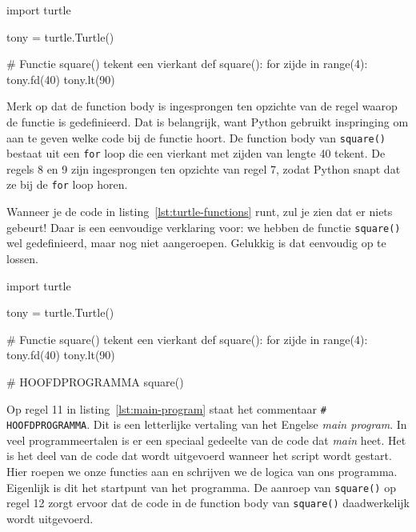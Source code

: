 \documentclass[../main]{subfiles}
\begin{document}
\begin{python}[style=mu, caption={\file{turtle\_functions.py}}, label={lst:turtle-functions},name=functionbody, framextopmargin=3pt, framexleftmargin=3pt]
import turtle

tony = turtle.Turtle()

# Functie square() tekent een vierkant
def square():
    for zijde in range(4):
        tony.fd(40)
        tony.lt(90)
\end{python}



 Merk op dat de function body is ingesprongen ten opzichte van de regel waarop de functie is gedefinieerd. Dat is belangrijk, want Python gebruikt inspringing om aan te geven welke code bij de functie hoort. De function body van \texttt{square()} bestaat uit een \texttt{for} loop die een vierkant met zijden van lengte 40 tekent. De regels 8 en 9 zijn ingesprongen ten opzichte van regel 7, zodat Python snapt dat ze bij de \texttt{for} loop horen.

 Wanneer je de code in listing~\ref{lst:turtle-functions} runt, zul je zien dat er niets gebeurt! Daar is een eenvoudige verklaring voor: we hebben de functie \texttt{square()} wel gedefinieerd, maar nog niet aangeroepen. Gelukkig is dat eenvoudig op te lossen.

\begin{python}[style=mu, caption={Functieaanroep in het hoofdprogramma}, label={lst:main-program}]
import turtle

tony = turtle.Turtle()

# Functie square() tekent een vierkant
def square():
    for zijde in range(4):
        tony.fd(40)
        tony.lt(90)

# HOOFDPROGRAMMA
square()
\end{python} 
\clearpage
Op regel 11 in listing~\ref{lst:main-program} staat het commentaar \texttt{\# HOOFDPROGRAMMA}. Dit is een letterlijke vertaling van het Engelse \emph{main program}. In veel programmeertalen is er een speciaal gedeelte van de code dat \emph{main} heet. Het is het deel van de code dat wordt uitgevoerd wanneer het script wordt gestart. Hier roepen we onze functies aan en schrijven we de logica van ons programma. Eigenlijk is dit het startpunt van het programma. De aanroep van \texttt{square()} op regel 12 zorgt ervoor dat de code in de function body van \texttt{square()} daadwerkelijk wordt uitgevoerd.
\end{document}
